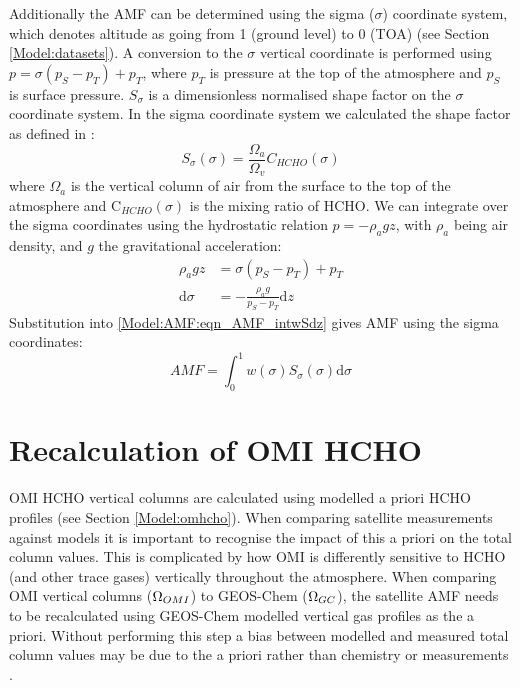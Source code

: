   Additionally the AMF can be determined using the sigma ($\sigma$) coordinate system, which denotes altitude as going from 1 (ground level) to 0 (TOA) (see Section \ref{Model:datasets}).
  A conversion to the $\sigma$ vertical coordinate is performed using $p = \sigma (p_S - p_T) + p_T$, where $p_T$ is pressure at the top of the atmosphere and $p_S$ is surface pressure. 
  $S_\sigma$ is a dimensionless normalised shape factor on the $\sigma$ coordinate system.
  In the sigma coordinate system we calculated the shape factor as defined in \textcite{Palmer2001}:
  \begin{equation}
    \label{Model:AMF:eqn_ShapeFactorSigma}
    S_\sigma(\sigma) = \frac{\Omega_a}{\Omega_v}C_{HCHO}(\sigma)
  \end{equation}
  where $\Omega_a$ is the vertical column of air from the surface to the top of the atmosphere and C$_{HCHO}(\sigma)$ is the mixing ratio of HCHO.
  We can integrate over the sigma coordinates using the hydrostatic relation $p = - \rho_a g z$, with $\rho_a$ being air density, and $g$ the gravitational acceleration:
  \begin{align*}
    \rho_a g z & = \sigma \left( p_S - p_T \right) + p_T \\
    \mathrm{d}\sigma  & = - \frac{ \rho_a g }{ p_S - p_T } \mathrm{d}z
  \end{align*}
  Substitution into \ref{Model:AMF:eqn_AMF_intwSdz} gives AMF using the sigma coordinates:
  \begin{equation} \label{Model:AMF:eqn_AMFintwSdsigma}
    AMF = \int_0^1 w(\sigma) S_\sigma(\sigma) \mathrm{d}\sigma
  \end{equation}

\section{Recalculation of OMI HCHO}
  \label{Model:omiRecalc}
  
  
  OMI HCHO vertical columns are calculated using modelled a priori HCHO profiles (see Section \ref{Model:omhcho}).
  When comparing satellite measurements against models it is important to recognise the impact of this a priori on the total column values.
  This is complicated by how OMI is differently sensitive to HCHO (and other trace gases) vertically throughout the atmosphere.
  When comparing OMI vertical columns ($\Omega_{OMI}$) to GEOS-Chem ($\Omega_{GC}$), the satellite AMF needs to be recalculated using GEOS-Chem modelled vertical gas profiles as the a priori.
  Without performing this step a bias between modelled and measured total column values may be due to the a priori rather than chemistry or measurements \parencite{Palmer2001, Lamsal2014}.
  

